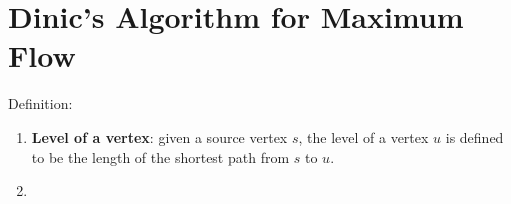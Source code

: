 \section{Dinic's Algorithm for Maximum Flow}

Definition:
\begin{enumerate}
    \item \textbf{Level of a vertex}: given a source vertex $s$, the level of a vertex $u$ is defined to be the length of the shortest path from $s$ to $u$.
    \item \textbf{}
\end{enumerate}